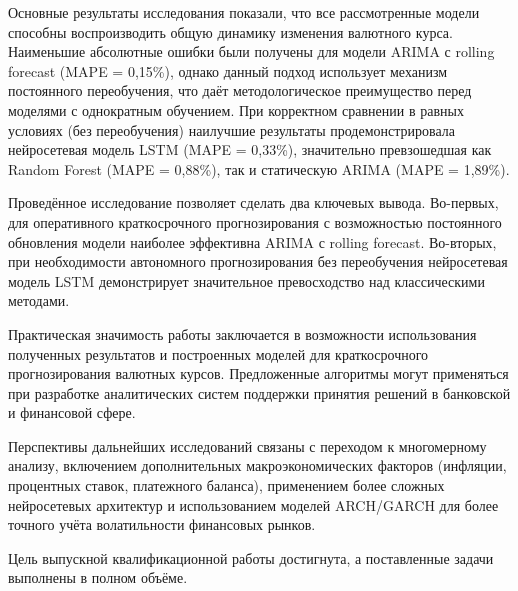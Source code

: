 Основные результаты исследования показали, что все рассмотренные модели способны воспроизводить общую динамику изменения валютного курса. Наименьшие абсолютные ошибки были получены для модели ARIMA с rolling forecast (MAPE = 0,15\%), однако данный подход использует механизм постоянного переобучения, что даёт методологическое преимущество перед моделями с однократным обучением. При корректном сравнении в равных условиях (без переобучения) наилучшие результаты продемонстрировала нейросетевая модель LSTM (MAPE = 0,33\%), значительно превзошедшая как Random Forest (MAPE = 0,88\%), так и статическую ARIMA (MAPE = 1,89\%).

Проведённое исследование позволяет сделать два ключевых вывода. Во-первых, для оперативного краткосрочного прогнозирования с возможностью постоянного обновления модели наиболее эффективна ARIMA с rolling forecast. Во-вторых, при необходимости автономного прогнозирования без переобучения нейросетевая модель LSTM демонстрирует значительное превосходство над классическими методами.

Практическая значимость работы заключается в возможности использования полученных результатов и построенных моделей для краткосрочного прогнозирования валютных курсов. Предложенные алгоритмы могут применяться при разработке аналитических систем поддержки принятия решений в банковской и финансовой сфере.

Перспективы дальнейших исследований связаны с переходом к многомерному анализу, включением дополнительных макроэкономических факторов (инфляции, процентных ставок, платежного баланса), применением более сложных нейросетевых архитектур и использованием моделей ARCH/GARCH для более точного учёта волатильности финансовых рынков.

Цель выпускной квалификационной работы достигнута, а поставленные задачи выполнены в полном объёме.
